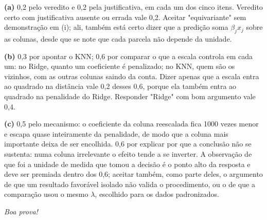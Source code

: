 \documentclass[11pt,a4paper]{article}
\begin{document}


\begin{criterio}
\textbf{(a)} 0,2 pelo veredito e 0,2 pela justificativa, em cada um dos cinco
itens. Veredito certo com justificativa ausente ou errada vale 0,2. Aceitar
"equivariante" sem demonstração em (i); ali, também está certo dizer que a predição
soma $\beta_jx_j$ sobre as colunas, desde que se note que cada parcela não depende da
unidade.

\textbf{(b)} 0,3 por apontar o KNN; 0,6 por comparar o que a escala controla em
cada um: no Ridge, quanto um coeficiente é penalizado; no KNN, quem são os
vizinhos, com as outras colunas saindo da conta. Dizer apenas que a escala entra ao
quadrado na distância vale 0,2 desses 0,6, porque ela também entra ao quadrado na
penalidade do Ridge. Responder "Ridge" com bom argumento vale 0,4.

\textbf{(c)} 0,5 pelo mecanismo: o coeficiente da coluna reescalada fica 1000
vezes menor e escapa quase inteiramente da penalidade, de modo que a coluna mais
importante deixa de ser encolhida. 0,6 por explicar por que a conclusão não se
sustenta: numa coluna irrelevante o efeito tende a se inverter. A observação de que
foi a unidade de medida que tomou a decisão é o ponto alto da resposta e deve ser
premiada dentro dos 0,6; aceitar também, como parte deles, o argumento de que um
resultado favorável isolado não valida o procedimento, ou o de que a comparação usou o
mesmo $\lambda$, escolhido para os dados padronizados.
\end{criterio}

\vfill
\begin{center}\small\itshape Boa prova!\end{center}
\end{document}
